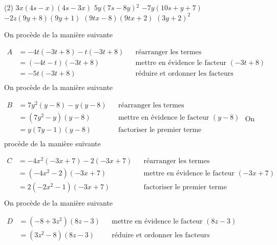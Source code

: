 \documentclass[a4paper,12pt]{report}
\begin{document}
\begin{cora}\phantom{ }

\begin{tasks}(2)
\task ${{3 x\mathopen{}\left(4 s-x\right)\mathclose{}\mathopen{}\left(4 s-3 x\right)\mathclose{}}}$
\task ${{5 y\mathopen{}\left(7 s-8 y\right)\mathclose{}^2}}$
\task ${{-7 y(10 s + y + 7 )}}$
\task ${{-2 z\mathopen{}\left(9 y+8 \right)\mathclose{}\mathopen{}\left(9 y+1\right)\mathclose{}}}$
\task ${{\left(9 t x-8 \right)\left(9 t x+2 \right)}}$
\task ${{\left(3 y+2 \right)^2}}$
\end{tasks}

\end{cora}

\begin{cora}\phantom{ }

\begin{tasks}
\task On procède de la manière suivante 

\medskip
 $\begin{aligned}A&=-4 t(-3 t + 8 )-t(-3 t + 8 )&&\text{réarranger les termes}\\&=(-4 t-t)(-3 t + 8 )&& \text{mettre en évidence le facteur } (-3 t + 8 )\\&={{-5 t(-3 t + 8 )}}&& \text{réduire et ordonner les facteurs}\\\end{aligned}$
\task On procède de la manière suivante 

\medskip
 $\begin{aligned}B&=7 y^2(y-8 )-y(y-8 )&&\text{réarranger les termes}\\&=(7 y^2-y)(y-8 )&& \text{mettre en évidence le facteur } (y-8 )\\&={{y(7 y-1)(y-8 )}}&& \text{factoriser le premier terme}\\\end{aligned}$
\task On procède de la manière suivante 

\medskip
 $\begin{aligned}C&=-4 x^2(-3 x + 7 )-2 (-3 x + 7 )&&\text{réarranger les termes}\\&=(-4 x^2-2 )(-3 x + 7 )&& \text{mettre en évidence le facteur } (-3 x + 7 )\\&={{2 (-2 x^2-1)(-3 x + 7 )}}&& \text{factoriser le premier terme}\\\end{aligned}$
\task On procède de la manière suivante 

\medskip
 $\begin{aligned}D&=(-8  + 3 z^2)(8 z-3 )&& \text{mettre en évidence le facteur } (8 z-3 )\\&={{(3 z^2-8 )(8 z-3 )}}&& \text{réduire et ordonner les facteurs}\\\end{aligned}$
\end{tasks}

\end{cora}
\end{document}
